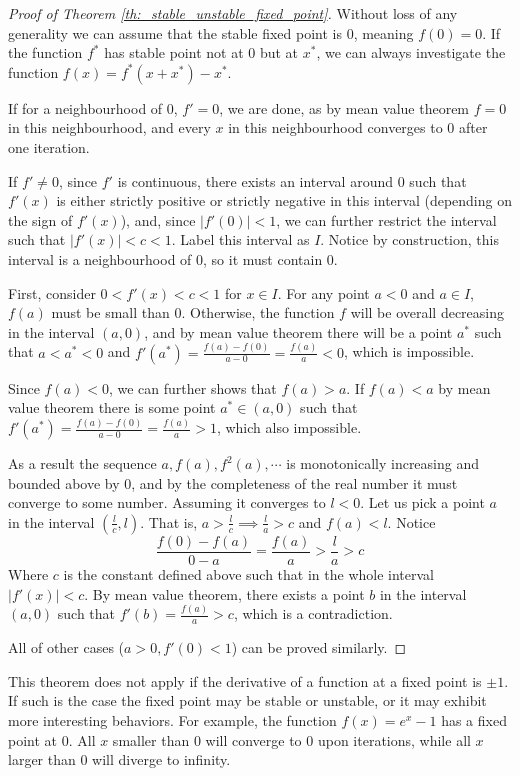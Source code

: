 \begin{proof}[Proof of Theorem \ref{th:_stable_unstable_fixed_point}]
	Without loss of any generality we can assume that the stable fixed point is $0$, meaning $f(0) = 0$. 
	If the function $f^*$ has stable point not at $0$ but at $x^*$, we can always investigate the function $f(x) = f^*(x+x^*) - x^*$. 
	
	If for a neighbourhood of $0$, $f' = 0$, we are done, as by mean value theorem $f = 0$ in this neighbourhood, and every $x$ in this neighbourhood converges to $0$ after one iteration.

	If $f' \neq 0$, since $f'$ is continuous, there exists an interval around $0$ such that $f'(x)$ is either strictly positive or strictly negative in this interval (depending on the sign of $f'(x)$), and, since $|f'(0)| < 1$, we can further restrict the interval such that $|f'(x)| < c < 1$. 
	Label this interval as $I$. 
	Notice by construction, this interval is a neighbourhood of $0$, so it must contain $0$.
	
	First, consider $0 < f'(x) < c < 1$ for $x \in I$. 
	For any point $a<0$ and $a\in I$,  $f(a)$ must be small than $0$. 
	Otherwise, the function $f$ will be overall decreasing in the interval $(a, 0)$, and by mean value theorem there will be a point $a^*$ such that $a < a^* < 0$ and $f'(a^*) = \frac{f(a) - f(0)}{a - 0} = \frac{f(a)}{a} < 0$, which is impossible.

	Since $f(a) < 0$, we can further shows that $f(a) > a$. 
	If $f(a) < a$ by mean value theorem there is some point $a^* \in (a, 0)$ such that $f'(a^*) = \frac{f(a) - f(0)}{a - 0} = \frac{f(a)}{a} > 1$, which also impossible.

	As a result the sequence $a, f(a), f^2(a), \cdots$ is monotonically increasing and bounded above by $0$, and by the completeness of the real number it must converge to some number. 
	Assuming it converges to $l < 0$. 
	Let us pick a point $a$ in the interval $(\frac{l}{c}, l)$. 
	That is, $a > \frac{l}{c} \implies \frac{l}{a} > c$ and $f(a) < l$.
	Notice 
	$$
	\frac{f(0) - f(a)}{0 - a} = \frac{f(a)}{a} > \frac{l}{a} > c
	$$
	Where $c$ is the constant defined above such that in the whole interval $|f'(x)| < c$.
	By mean value theorem, there exists a point $b$ in the interval $(a, 0)$ such that $f'(b) = \frac{f(a)}{a} > c$, which is a contradiction.

	All of other cases ($a > 0, f'(0) < 1$) can be proved similarly.
\end{proof}

This theorem does not apply if the derivative of a function at a fixed point is $\pm 1$.
If such is the case the fixed point may be stable or unstable, or it may exhibit more interesting behaviors.
For example, the function $f(x) = e^x - 1$ has a fixed point at $0$.
All $x$ smaller than $0$ will converge to $0$ upon iterations, while all $x$ larger than $0$ will diverge to infinity.

